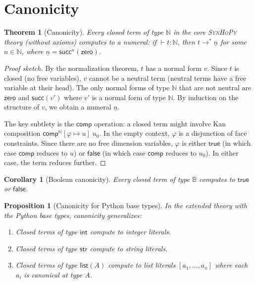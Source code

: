 \documentclass[11pt,a4paper]{report}
\theoremstyle{definition}
\theoremstyle{plain}
\newtheorem{theorem}[definition]{Theorem}
\newtheorem{proposition}[definition]{Proposition}
\newtheorem{corollary}[definition]{Corollary}
\newcommand{\Nat}{\mathbb{N}}
\newcommand{\Bool}{\mathbb{B}}
\newcommand{\comp}{\mathsf{comp}}
\newcommand{\synhopy}{\textsc{SynHoPy}}
\begin{document}
\section{Canonicity}

\begin{theorem}[Canonicity]
\label{thm:canonicity}
Every closed term of type $\Nat$ in the core \synhopy{} theory (without axioms)
computes to a numeral: if $\vdash t : \Nat$, then $t \to^* \underline{n}$ for
some $n \in \mathbb{N}$, where $\underline{n} = \mathsf{succ}^n(\mathsf{zero})$.
\end{theorem}
\begin{proof}[Proof sketch]
By the normalization theorem, $t$ has a normal form $v$.  Since $t$ is closed
(no free variables), $v$ cannot be a neutral term (neutral terms have a free
variable at their head).  The only normal forms of type $\Nat$ that are not
neutral are $\mathsf{zero}$ and $\mathsf{succ}(v')$ where $v'$ is a normal
form of type $\Nat$.  By induction on the structure of $v$, we obtain a
numeral $\underline{n}$.

The key subtlety is the $\comp$ operation: a closed term might involve
Kan composition $\comp^\Nat[\varphi \mapsto u]\;u_0$.  In the empty context,
$\varphi$ is a disjunction of face constraints.  Since there are no free
dimension variables, $\varphi$ is either $\mathsf{true}$ (in which case $\comp$
reduces to $u$) or $\mathsf{false}$ (in which case $\comp$ reduces to $u_0$).
In either case, the term reduces further.
\end{proof}

\begin{corollary}[Boolean canonicity]
Every closed term of type $\Bool$ computes to $\mathsf{true}$ or
$\mathsf{false}$.
\end{corollary}

\begin{proposition}[Canonicity for Python base types]
In the extended theory with the Python base types, canonicity generalizes:
\begin{enumerate}
  \item Closed terms of type $\mathsf{int}$ compute to integer literals.
  \item Closed terms of type $\mathsf{str}$ compute to string literals.
  \item Closed terms of type $\mathsf{list}(A)$ compute to list literals
    $[a_1, \ldots, a_n]$ where each $a_i$ is canonical at type $A$.
\end{enumerate}
\end{proposition}
\end{document}
